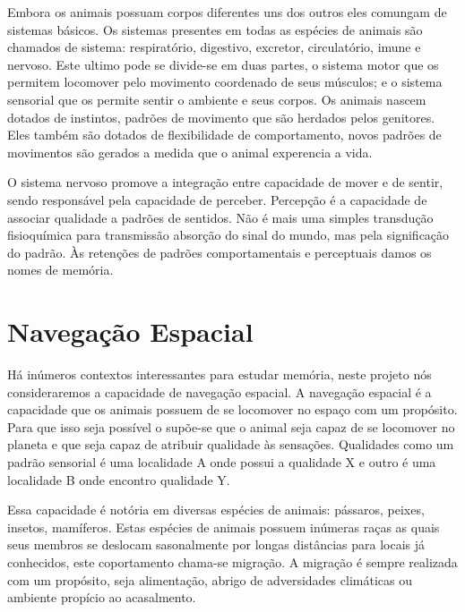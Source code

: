Embora os animais possuam corpos diferentes uns dos outros eles comungam de sistemas básicos.
Os sistemas presentes em todas as espécies de animais são chamados de sistema: respiratório, digestivo, excretor, circulatório, imune e nervoso.
Este ultimo pode se divide-se em duas partes, o sistema motor que os permitem locomover pelo movimento coordenado de seus músculos; e o sistema sensorial que os permite sentir o ambiente e seus corpos.
Os animais nascem dotados de instintos, padrões de movimento que são herdados pelos genitores.
Eles também são dotados de flexibilidade de comportamento, novos padrões de movimentos são gerados a medida que o animal experencia a vida.

O sistema nervoso promove a integração entre capacidade de mover e de sentir, sendo responsável pela capacidade de perceber.
Percepção é a capacidade de associar qualidade a padrões de sentidos.
Não é mais uma simples transdução fisioquímica para transmissão absorção do sinal do mundo, mas pela significação do padrão.
Às retenções de padrões comportamentais e perceptuais damos os nomes de memória.

\section{Navegação Espacial}

Há inúmeros contextos interessantes para estudar memória, neste projeto nós consideraremos a capacidade de navegação espacial.
A navegação espacial é a capacidade que os animais possuem de se locomover no espaço com um propósito.
Para que isso seja possível o supõe-se que o animal seja capaz de se locomover no planeta e que seja capaz de atribuir qualidade às sensações.
Qualidades como um padrão sensorial é uma localidade A onde possui a qualidade X e outro é uma localidade B onde encontro qualidade Y.

Essa capacidade é notória em diversas espécies de animais: pássaros, peixes, insetos, mamíferos.
Estas espécies de animais possuem inúmeras raças as quais seus membros se deslocam sasonalmente por longas distâncias para locais já conhecidos, este coportamento chama-se migração.
A migração é sempre realizada com um propósito, seja alimentação, abrigo de adversidades climáticas ou ambiente propício ao acasalmento.

